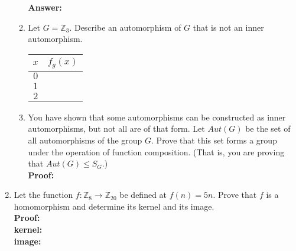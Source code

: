 \documentclass[12pt]{article}
\newcommand{\bbZ}{\mathbb{Z}}
\begin{document}
\begin{enumerate}
\begin{enumerate}
	\textbf{Answer:}
	\vfill
	
	\item Let $G=\bbZ_3.$ Describe an automorphism of $G$ that is not an inner automorphism.\\
	
	\begin{tabular}{c|c}
	$x$ & $f_g(x)$ \\
	\hline
	$0$ & \\
	$1$ & \\
	$2$ & \\
	\end{tabular}
	
	\item You have shown that some automorphisms can be constructed as inner automorphisms, but not all are of that form. Let $Aut(G)$ be the set of all automorphisms of the group $G.$ Prove that this set forms a group under the operation of function composition. (That is, you are proving that $Aut(G) \leq S_G.$)\\
	
	\textbf{Proof:}
	\vfill
	
	\end{enumerate}
\newpage
\item Let the function $f: \bbZ_8 \to \bbZ_{20}$ be defined at $f(n)=5n.$ Prove that $f$ is a homomorphism and determine its kernel and its image.\\

\textbf{Proof:}  \\
	
\textbf{kernel:}\\

\textbf{image:}\\


\end{enumerate}
\end{document}
